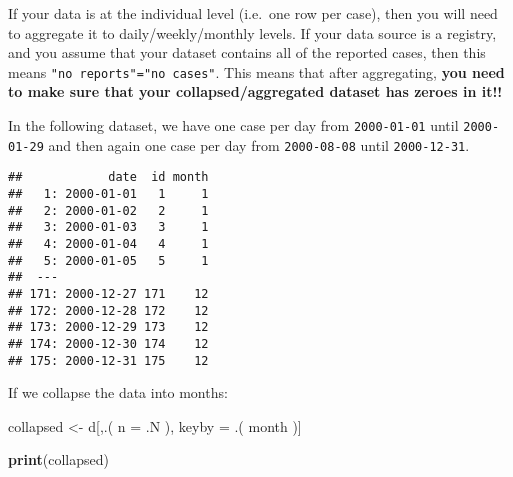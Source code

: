 \documentclass[]{book}
\newenvironment{Shaded}{\begin{snugshade}}{\end{snugshade}}
\newcommand{\KeywordTok}[1]{\textcolor[rgb]{0.13,0.29,0.53}{\textbf{#1}}}
\newcommand{\DataTypeTok}[1]{\textcolor[rgb]{0.13,0.29,0.53}{#1}}
\newcommand{\DecValTok}[1]{\textcolor[rgb]{0.00,0.00,0.81}{#1}}
\newcommand{\StringTok}[1]{\textcolor[rgb]{0.31,0.60,0.02}{#1}}
\newcommand{\OperatorTok}[1]{\textcolor[rgb]{0.81,0.36,0.00}{\textbf{#1}}}
\newcommand{\ErrorTok}[1]{\textcolor[rgb]{0.64,0.00,0.00}{\textbf{#1}}}
\newcommand{\NormalTok}[1]{#1}
\begin{document}
If your data is at the individual level (i.e.~one row per case), then
you will need to aggregate it to daily/weekly/monthly levels. If your
data source is a registry, and you assume that your dataset contains all
of the reported cases, then this means
\texttt{"no\ reports"="no\ cases"}. This means that after aggregating,
\textbf{you need to make sure that your collapsed/aggregated dataset has
zeroes in it!!}

In the following dataset, we have one case per day from
\texttt{2000-01-01} until \texttt{2000-01-29} and then again one case
per day from \texttt{2000-08-08} until \texttt{2000-12-31}.

\begin{Shaded}
\end{Shaded}

\begin{verbatim}
##            date  id month
##   1: 2000-01-01   1     1
##   2: 2000-01-02   2     1
##   3: 2000-01-03   3     1
##   4: 2000-01-04   4     1
##   5: 2000-01-05   5     1
##  ---                     
## 171: 2000-12-27 171    12
## 172: 2000-12-28 172    12
## 173: 2000-12-29 173    12
## 174: 2000-12-30 174    12
## 175: 2000-12-31 175    12
\end{verbatim}

If we collapse the data into months:

\begin{Shaded}
\begin{Highlighting}[]
\NormalTok{collapsed <-}\StringTok{ }\NormalTok{d[,.(}
  \DataTypeTok{n =}\NormalTok{ .N}
\NormalTok{), keyby =}\StringTok{ }\NormalTok{.(}
\NormalTok{  month}
\NormalTok{)]}

\KeywordTok{print}\NormalTok{(collapsed)}
\end{Highlighting}
\end{Shaded}
\end{document}
